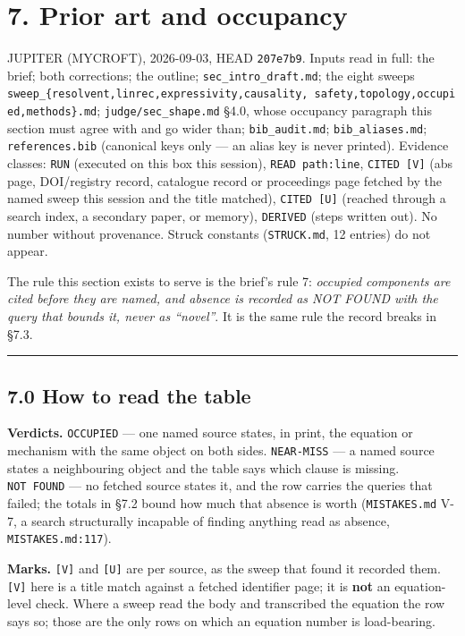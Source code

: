 \documentclass[11pt,a4paper]{article}
\theoremstyle{plain}
\theoremstyle{definition}
\theoremstyle{remark}
\begin{document}
\section{7. Prior art and occupancy}\label{prior-art-and-occupancy}

JUPITER (MYCROFT), 2026-09-03, HEAD \texttt{207e7b9}. Inputs read in
full: the brief; both corrections; the outline;
\texttt{sec\_intro\_draft.md}; the eight sweeps
\texttt{sweep\_\{resolvent,linrec,expressivity,causality,\ safety,topology,occupied,methods\}.md};
\texttt{judge/sec\_shape.md} §4.0, whose occupancy paragraph this
section must agree with and go wider than; \texttt{bib\_audit.md};
\texttt{bib\_aliases.md}; \texttt{references.bib} (canonical keys only
--- an alias key is never printed). Evidence classes: \texttt{RUN}
(executed on this box this session), \texttt{READ\ path:line},
\texttt{CITED\ {[}V{]}} (abs page, DOI/registry record, catalogue record
or proceedings page fetched by the named sweep this session and the
title matched), \texttt{CITED\ {[}U{]}} (reached through a search index,
a secondary paper, or memory), \texttt{DERIVED} (steps written out). No
number without provenance. Struck constants (\texttt{STRUCK.md}, 12
entries) do not appear.

The rule this section exists to serve is the brief's rule 7:
\emph{occupied components are cited before they are named, and absence
is recorded as NOT FOUND with the query that bounds it, never as
``novel''}. It is the same rule the record breaks in §7.3.

\begin{center}\rule{0.5\linewidth}{0.5pt}\end{center}

\subsection{7.0 How to read the table}\label{how-to-read-the-table}

\textbf{Verdicts.} \texttt{OCCUPIED} --- one named source states, in
print, the equation or mechanism with the same object on both sides.
\texttt{NEAR-MISS} --- a named source states a neighbouring object and
the table says which clause is missing. \texttt{NOT\ FOUND} --- no
fetched source states it, and the row carries the queries that failed;
the totals in §7.2 bound how much that absence is worth
(\texttt{MISTAKES.md} V-7, a search structurally incapable of finding
anything read as absence, \texttt{MISTAKES.md:117}).

\textbf{Marks.} \texttt{{[}V{]}} and \texttt{{[}U{]}} are per source, as
the sweep that found it recorded them. \texttt{{[}V{]}} here is a title
match against a fetched identifier page; it is \textbf{not} an
equation-level check. Where a sweep read the body and transcribed the
equation the row says so; those are the only rows on which an equation
number is load-bearing.
\end{document}

